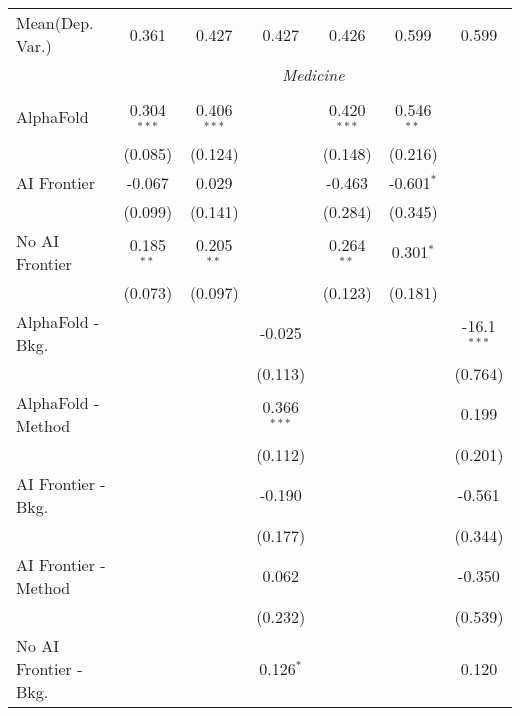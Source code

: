 \begin{tabular}{lcccccc}
Mean(Dep. Var.) & 0.361 & 0.427 & 0.427 & 0.426 & 0.599 & 0.599 \\
 & \multicolumn{6}{c}{\textit{Medicine}} \\ \\
   AlphaFold               & 0.304$^{***}$ & 0.406$^{***}$ &               & 0.420$^{***}$ & 0.546$^{**}$ &   \\   
                           & (0.085)       & (0.124)       &               & (0.148)       & (0.216)      &   \\   
   AI Frontier             & -0.067        & 0.029         &               & -0.463        & -0.601$^{*}$ &   \\   
                           & (0.099)       & (0.141)       &               & (0.284)       & (0.345)      &   \\   
   No AI Frontier          & 0.185$^{**}$  & 0.205$^{**}$  &               & 0.264$^{**}$  & 0.301$^{*}$  &   \\   
                           & (0.073)       & (0.097)       &               & (0.123)       & (0.181)      &   \\   
   AlphaFold - Bkg.        &               &               & -0.025        &               &              & -16.1$^{***}$\\   
                           &               &               & (0.113)       &               &              & (0.764)\\   
   AlphaFold - Method      &               &               & 0.366$^{***}$ &               &              & 0.199\\   
                           &               &               & (0.112)       &               &              & (0.201)\\   
   AI Frontier - Bkg.      &               &               & -0.190        &               &              & -0.561\\   
                           &               &               & (0.177)       &               &              & (0.344)\\   
   AI Frontier - Method    &               &               & 0.062         &               &              & -0.350\\   
                           &               &               & (0.232)       &               &              & (0.539)\\   
   No AI Frontier - Bkg.   &               &               & 0.126$^{*}$   &               &              & 0.120\\   

\end{tabular}
